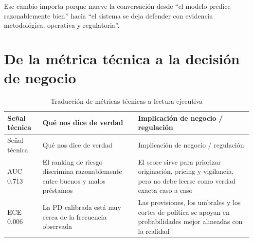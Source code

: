 \documentclass[
  spanish,
  11pt,
  letterpaper,
]{scrbook}
\theoremstyle{plain}
\theoremstyle{remark}
\begin{document}
Ese cambio importa porque mueve la conversación desde ``el modelo
predice razonablemente bien'' hacia ``el sistema se deja defender con
evidencia metodológica, operativa y regulatoria''.

\section{De la métrica técnica a la decisión de
negocio}\label{de-la-muxe9trica-tuxe9cnica-a-la-decisiuxf3n-de-negocio}

\begin{longtable}[]{@{}
  >{\raggedright\arraybackslash}p{}
  >{\raggedright\arraybackslash}p{}
  >{\raggedright\arraybackslash}p{}@{}}
\caption{Traducción de métricas técnicas a lectura
ejecutiva}\label{tbl-technical-to-business}\tabularnewline
\toprule\noalign{}
\begin{minipage}[b]{\linewidth}\raggedright
Señal técnica
\end{minipage} & \begin{minipage}[b]{\linewidth}\raggedright
Qué nos dice de verdad
\end{minipage} & \begin{minipage}[b]{\linewidth}\raggedright
Implicación de negocio / regulación
\end{minipage} \\
\midrule\noalign{}
\endfirsthead
\toprule\noalign{}
\begin{minipage}[b]{\linewidth}\raggedright
Señal técnica
\end{minipage} & \begin{minipage}[b]{\linewidth}\raggedright
Qué nos dice de verdad
\end{minipage} & \begin{minipage}[b]{\linewidth}\raggedright
Implicación de negocio / regulación
\end{minipage} \\
\midrule\noalign{}
\endhead
\bottomrule\noalign{}
\endlastfoot
AUC 0.713 & El ranking de riesgo discrimina razonablemente entre buenos
y malos préstamos & El score sirve para priorizar originación, pricing y
vigilancia, pero no debe leerse como verdad exacta caso a caso \\
ECE 0.006 & La PD calibrada está muy cerca de la frecuencia observada &
Las provisiones, los umbrales y los cortes de política se apoyan en
probabilidades mejor alineadas con la realidad \\

\end{longtable}
\end{document}
